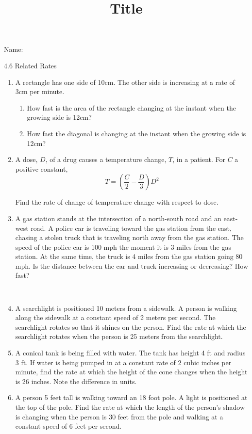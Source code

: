 \documentclass[12pt]{article}
\title{Title}
\begin{document}

 Name:
 \begin{center}\large{4.6 Related Rates}\end{center}

\begin{enumerate}
\item A rectangle has one side of 10cm. The other side is increasing at a rate of 3cm per minute.
	\begin{enumerate}
	\item How fast is the area of the rectangle changing at the instant when the growing side is 12cm?	\vspace{10mm}
	\item How fast the diagonal is changing at the instant when the growing side is 12cm?
	\vspace{10mm}
	\end{enumerate}

\item A dose, $D$, of a drug causes a temperature change, $T$, in a patient. For $C$ a positive constant, $$T=\left(\frac{C}{2}-\frac{D}{3}\right)D^{2}$$

Find the rate of change of temperature change with respect to dose.

\vfill 
\item A gas station stands at the intersection of a north-south road and an east-west road. A police car is traveling toward the gas station from the east, chasing a stolen truck that is traveling north away from the gas station. The speed of the police car is 100 mph the moment it is 3 miles from the gas station. At the same time, the truck is 4 miles from the gas station going 80 mph. Is the distance between the car and truck increasing or decreasing? How fast?
\vfill

\newpage
~
\item A searchlight is positioned 10 meters from a sidewalk. A person is walking along the sidewalk at a constant speed of 2 meters per second. The searchlight rotates so that it shines on the person. Find the rate at which the searchlight rotates when the person is 25 meters from the searchlight.
\vfill 
\item A conical tank is being filled with water. The tank has height 4 ft and radius 3 ft. If water is being pumped in at a constant rate of 2 cubic inches per minute, find the rate at which the height of the cone changes when the height is 26 inches. Note the difference in units.
\vfill
\item A person 5 feet tall is walking toward an 18 foot pole. A light is positioned at the top of the pole. Find the rate at which the length of the person’s shadow is changing when the person is 30 feet from the pole and walking at a constant speed of 6 feet per second.

\vfill

\end{enumerate}
\end{document}
